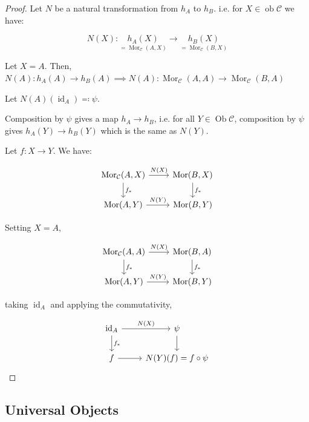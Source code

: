 \documentclass{article}
\theoremstyle{definition}
\begin{document}
    \begin{proof}
        Let \(N\) be a natural transformation from \(h_A\) to \(h_B\). i.e. for \(X\in \operatorname{ob} \mathcal{C}\) we have:

        \[
            N(X) : \underset{= \operatorname{Mor}_{\mathcal{C}} (A,X)}{h_A(X)} \to \underset{=\operatorname{Mor}_{\mathcal{C}} (B,X)}{h_B(X)}  
        \]

        Let \(X = A\). Then, \(N(A): h_A(A) \to h_B(A) \implies N(A): \operatorname{Mor}_{\mathcal{C}} (A,A) \to \operatorname{Mor}_{\mathcal{C}} (B,A)\)
        
        Let \(N(A)(\operatorname{id}_{A})\eqqcolon \psi\).
        
        Composition by \(\psi\) gives a map \(h_A \to h_B\), i.e. for all \(Y\in \operatorname{Ob} \mathcal{C}\), composition by \(\psi\) gives \(h_A(Y) \to h_B(Y)\) which is the same as \(N(Y)\).

        Let \(f: X \to Y\). We have:

        \[
            \begin{tikzcd}
                \operatorname{Mor}_{\mathcal{C}} (A,X) \ar[r,"N(X)"] \ar[d,"f_{\ast}"] & \operatorname{Mor}(B,X) \ar[d,"f_{\ast}"] \\ \operatorname{Mor}(A,Y) \ar[r,"N(Y)"] & \operatorname{Mor}(B,Y)
            \end{tikzcd}
        \]

        Setting \(X = A\),

        \[
            \begin{tikzcd}
                \operatorname{Mor}_{\mathcal{C}} (A,A) \ar[r,"N(X)"] \ar[d,"f_{\ast}"] & \operatorname{Mor}(B,A) \ar[d,"f_{\ast}"] \\ \operatorname{Mor}(A,Y) \ar[r,"N(Y)"] & \operatorname{Mor}(B,Y)
            \end{tikzcd}
        \]

        taking \(\operatorname{id}_{A}\) and applying the commutativity,

        \[
            \begin{tikzcd}
                \operatorname{id}_{A} \ar[r,"N(X)"] \ar[d,"f_{\ast}"] & \psi \ar[d] \\ f \ar[r] & N(Y)(f) = f \circ \psi  
            \end{tikzcd}
        \]
    \end{proof}

    \subsection*{Universal Objects}
\end{document}
